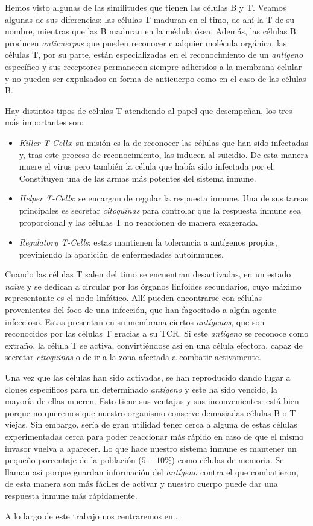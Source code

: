 Hemos visto algunas de las similitudes que tienen las células B y T. Veamos algunas de sus diferencias: las células T maduran en el timo, de ahí la T de su nombre, mientras que las B maduran en la médula ósea. Además, las células B producen \textit{anticuerpos} que pueden reconocer cualquier molécula orgánica, las células T, por su parte, están especializadas en el reconocimiento de un \textit{antígeno} específico y sus receptores permanecen siempre adheridos a la membrana celular y no pueden ser expulsados en forma de anticuerpo como en el caso de las células B.

Hay distintos tipos de células T atendiendo al papel que desempeñan, los tres más importantes son: 
\begin{itemize}
	\item \textit{Killer T-Cells}: su misión es la de reconocer las células que han sido infectadas y, tras este proceso de reconocimiento, las inducen al suicidio. De esta manera muere el virus pero también la célula que había sido infectada por el. Constituyen una de las armas más potentes del sistema inmune.
	
	\item \textit{Helper T-Cells}: se encargan de regular la respuesta inmune. Una de sus tareas principales es secretar \textit{citoquinas} para controlar que la respuesta inmune sea proporcional y las células T no reaccionen de manera exagerada.
	
	\item \textit{Regulatory T-Cells}: estas mantienen la tolerancia a antígenos propios, previniendo la aparición de enfermedades autoinmunes.
\end{itemize}

Cuando las células T salen del timo se encuentran desactivadas, en un estado \textit{naïve} y se dedican a circular por los órganos linfoides secundarios, cuyo máximo representante es el nodo linfático. Allí pueden encontrarse con células provenientes del foco de una infección, que han fagocitado a algún agente infeccioso. Estas presentan en su membrana ciertos \textit{antígenos}, que son reconocidos por las células T gracias a su TCR. Si este \textit{antígeno} se reconoce como extraño, la célula T se activa, convirtiéndose así en una célula efectora, capaz de secretar \textit{citoquinas} o de ir a la zona afectada a combatir activamente.

Una vez que las células han sido activadas, se han reproducido dando lugar a clones específicos para un determinado \textit{antígeno} y este ha sido vencido, la mayoría de ellas mueren. Esto tiene sus ventajas y sus inconvenientes: está bien porque no queremos que nuestro organismo conserve demasiadas células B o T viejas. Sin embargo, sería de gran utilidad tener cerca a alguna de estas células experimentadas cerca para poder reaccionar más rápido en caso de que el mismo invasor vuelva a aparecer. Lo que hace nuestro sistema inmune es mantener un pequeño porcentaje de la población  ($5-10\%$) como células de memoria. Se llaman así porque guardan información del \textit{antígeno} contra el que combatieron, de esta manera son más fáciles de activar y nuestro cuerpo puede dar una respuesta inmune más rápidamente.

A lo largo de este trabajo nos centraremos en...





 